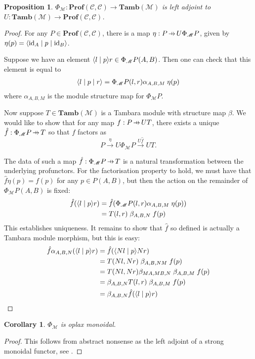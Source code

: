 \documentclass[11pt,a4paper]{article}
\theoremstyle{plain}
\newtheorem{proposition}[theorem]{Proposition}
\newtheorem{corollary}[theorem]{Corollary}
\theoremstyle{definition}
\newcommand{\C}{\mathscr{C}}
\newcommand{\M}{\mathscr{M}}
\newcommand{\Pastro}{\Phi}
\newcommand{\Prof}{\mathbf{Prof}}
\newcommand{\Tamb}{\mathbf{Tamb}}
\newcommand{\id}{\mathrm{id}}
\newcommand{\rep}[2]{{\ensuremath \left\langle #1 \mid #2 \right\rangle}}
\newcommand{\repthree}[3]{{\ensuremath \langle #1 \mid #2 \mid #3 \rangle}}
\newcommand{\hto}{\ensuremath{\,\mathaccent\shortmid\rightarrow\,}}
\begin{document}
\begin{proposition}
  $\Pastro_\M : \Prof(\C, \C) \to \Tamb(\M)$ is left adjoint to $U : \Tamb(\M) \to \Prof(\C, \C)$.
\end{proposition}
\begin{proof}
  For any $P \in \Prof(\C, \C)$, there is a map $\eta : P \hto U \Phi_\M P$, given by $\eta(p) = \repthree{\id_A}{p}{\id_B }$.

  Suppose we have an element $\rep{l}{p}{r} \in \Pastro_\M P(A,B)$. Then one can check that this element is equal to
  \begin{align*}
    \repthree{l}{p}{r } = \Pastro_\M P(l, r) \alpha_{A, B, M} \; \eta(p)
  \end{align*}
  where $\alpha_{A, B, M}$ is the module structure map for $\Pastro_\M P$.

  Now suppose $T \in \Tamb(\M)$ is a Tambara module with structure map $\beta$. We would like to show that for any map $f : P \hto UT$, there exists a unique $\hat f : \Phi_\M P \hto T$ so that $f$ factors as \[P \xrightarrow{\eta} U \Phi_\M P \xrightarrow{U\hat f} UT. \]

  The data of such a map $\hat f : \Phi_\M P \hto T$ is a natural transformation between the underlying profunctors. For the factorisation property to hold, we must have that $\hat{f}\eta(p) = f(p)$ for any $p \in P(A,B)$, but then the action on the remainder of $\Phi_\M P(A, B)$ is fixed:
  \begin{align*}
    \hat{f}(\rep{l}{p}{r }) &= \hat{f}(\Pastro_\M P(l, r) \alpha_{A, B, M} \; \eta(p)) \\
                                     &=T(l, r) \; \beta_{A, B, N} \; f(p)
  \end{align*}
  This establishes uniqueness. It remains to show that $\hat{f}$ so defined is actually a Tambara module morphism, but this is easy:
  \begin{align*}
    \hat{f}\alpha_{A,B,N}(\rep{l}{p}{r })
    &= \hat{f}(\rep{Nl}{p}{Nr }) \\
    &= T(Nl, Nr) \; \beta_{A, B, NM} \; f(p) \\
    &= T(Nl, Nr) \beta_{MA,MB,N} \; \beta_{A, B, M} \; f(p) \\
    &= \beta_{A,B,N} T(l, r) \; \beta_{A, B, M} \; f(p) \\
    &= \beta_{A,B,N} \hat{f} (\rep{l}{p}{r })
  \end{align*}
\end{proof}

\begin{corollary}
  $\Pastro_\M$ is oplax monoidal.
\end{corollary}
\begin{proof}
  This follows from abstract nonsense as the left adjoint of a strong monoidal functor, see \cite{Kelly1974}.
\end{proof}
\end{document}
